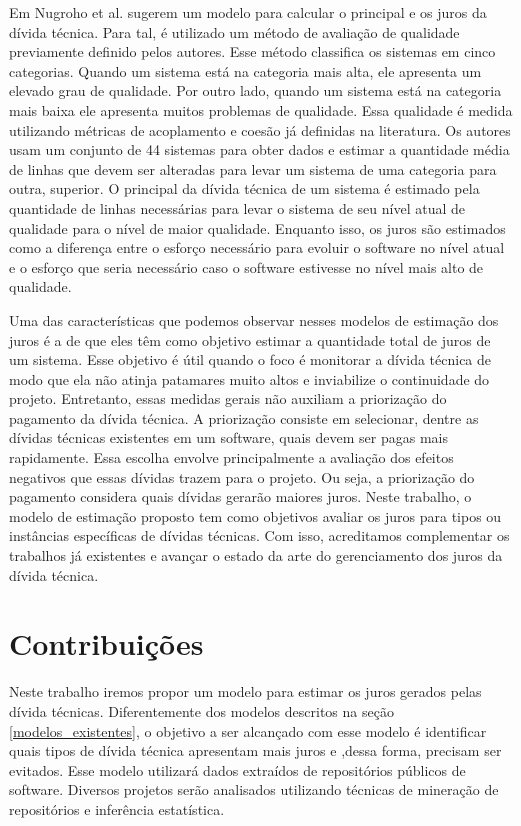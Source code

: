 Em \cite{nugroho2011empirical} Nugroho et al. sugerem um modelo para calcular o principal e os juros da dívida técnica. Para tal, é utilizado um método de avaliação de qualidade
previamente definido pelos autores. Esse método classifica os sistemas em cinco categorias. Quando um sistema está na categoria mais alta, ele apresenta um elevado grau
de qualidade. Por outro lado, quando um sistema está na categoria mais baixa ele apresenta muitos problemas de qualidade. Essa qualidade é medida utilizando métricas
de acoplamento e coesão já definidas na literatura. Os autores usam um conjunto de 44 sistemas para obter dados e estimar a quantidade média de linhas que
 devem ser alteradas para levar um sistema de uma categoria para outra, superior. O principal da dívida técnica de um sistema é estimado pela quantidade de linhas necessárias
 para levar o sistema de seu nível atual de qualidade para o nível de maior qualidade. Enquanto isso, os juros são estimados como a diferença entre o esforço necessário para evoluir o software no nível atual e o esforço que seria necessário caso o software estivesse no nível mais alto de qualidade. 
 
 Uma das características que podemos observar nesses modelos de estimação dos juros é a de que eles têm como objetivo estimar a quantidade total de juros de um sistema. Esse objetivo é útil quando o foco é monitorar a dívida técnica de modo que ela não atinja patamares muito altos e inviabilize o continuidade do projeto. Entretanto, essas medidas gerais não auxiliam a priorização do pagamento da dívida técnica. A priorização consiste em selecionar, dentre as dívidas técnicas existentes em um software, quais devem ser pagas mais rapidamente. Essa escolha envolve principalmente a avaliação dos efeitos negativos que essas dívidas trazem para o projeto. Ou seja, a priorização do pagamento considera quais dívidas gerarão maiores juros. Neste trabalho, o modelo de estimação proposto tem como objetivos avaliar os juros para tipos ou instâncias específicas de dívidas técnicas. Com isso, acreditamos complementar os trabalhos já existentes e avançar o estado da arte do gerenciamento dos juros da dívida técnica. 



\section{Contribuições}

Neste trabalho iremos propor  um modelo para estimar os juros gerados pelas dívida técnicas. Diferentemente dos modelos descritos na seção \ref{modelos_existentes}, o objetivo a ser alcançado com esse modelo é identificar quais tipos de dívida técnica apresentam mais juros e ,dessa forma, precisam ser evitados. Esse modelo utilizará dados extraídos de repositórios públicos de software. Diversos projetos serão analisados utilizando técnicas de mineração de repositórios e inferência estatística. 


